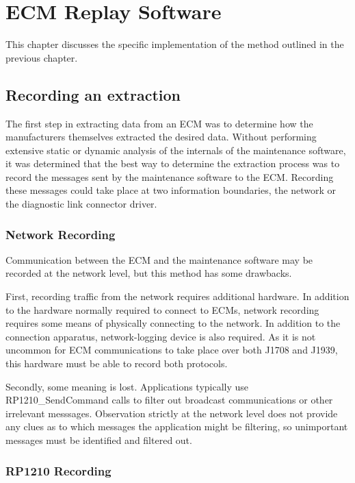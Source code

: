\chapter{ECM Replay Software}

This chapter discusses the specific implementation of the method outlined in the previous chapter.

\section{Recording an extraction}

The first step in extracting data from an ECM was to determine how the manufacturers themselves extracted
the desired data. Without performing extensive static or dynamic analysis of the internals of the maintenance
software, it was determined that the best way to determine the extraction process was to record the messages
sent by the maintenance software to the ECM. Recording these messages could take place at two information boundaries,
the network or the diagnostic link connector driver.

\subsection{Network Recording}

Communication between the ECM and the maintenance software may be recorded at the network level, but this method
has some drawbacks.

First, recording traffic from the network requires additional hardware. In addition to the hardware normally required
to connect to ECMs, network recording requires some means of physically connecting to the network. In addition to the 
connection apparatus, network-logging device is also required. As it is not uncommon for ECM communications to take place over both J1708 and J1939, 
this hardware must be able to record both protocols.

Secondly, some meaning is lost. Applications typically use RP1210\_SendCommand calls to filter out broadcast communications
or other irrelevant messsages. Observation strictly at the network level does not provide any clues as to which messages
the application might be filtering, so unimportant messages must be identified and filtered out.

\subsection{RP1210 Recording}

